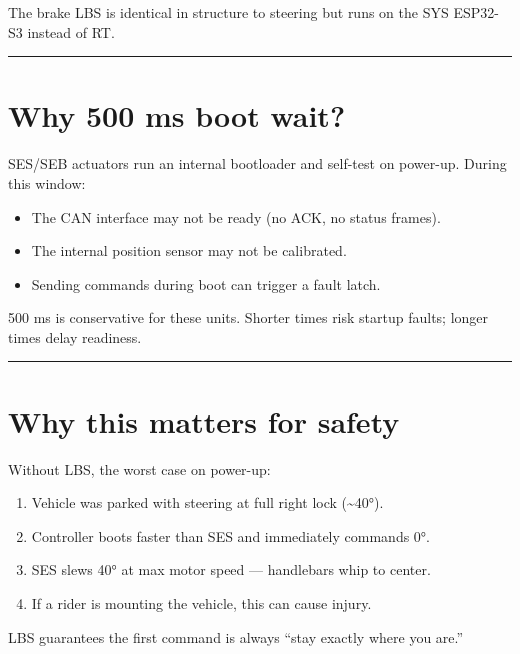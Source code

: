 \documentclass[12pt,a4paper,oneside]{report}
\providecommand{\tightlist}{\setlength{\itemsep}{0pt}\setlength{\parskip}{0pt}}
\begin{document}
The brake LBS is identical in structure to steering but runs on the SYS ESP32-S3
instead of RT.

\begin{center}\rule{0.5\linewidth}{0.5pt}\end{center}

\section{Why 500 ms boot wait?}\label{why-500-ms-boot-wait}

SES/SEB actuators run an internal bootloader and self-test on power-up. During
this window:

\begin{itemize}
\tightlist
\item
  The CAN interface may not be ready (no ACK, no status frames).
\item
  The internal position sensor may not be calibrated.
\item
  Sending commands during boot can trigger a fault latch.
\end{itemize}

500 ms is conservative for these units. Shorter times risk startup faults;
longer times delay readiness.

\begin{center}\rule{0.5\linewidth}{0.5pt}\end{center}

\section{Why this matters for safety}\label{why-this-matters-for-safety}

Without LBS, the worst case on power-up:

\begin{enumerate}
\def\labelenumi{\arabic{enumi}.}
\tightlist
\item
  Vehicle was parked with steering at full right lock (\textasciitilde40°).
\item
  Controller boots faster than SES and immediately commands 0°.
\item
  SES slews 40° at max motor speed --- handlebars whip to center.
\item
  If a rider is mounting the vehicle, this can cause injury.
\end{enumerate}

LBS guarantees the first command is always ``stay exactly where you are.''
\end{document}
